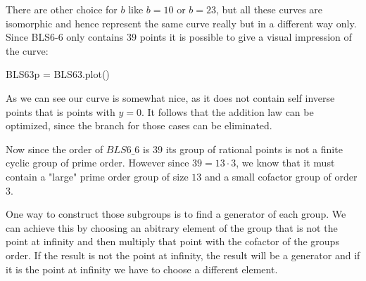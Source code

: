 There are other choice for $b$ like $b=10$ or $b=23$, but all these curves are isomorphic and hence represent the same curve really but in a different way only. Since BLS6-6 only contains $39$ points it is possible to give a visual impression of the curve:
\begin{sagesilent}
BLS63p = BLS63.plot()
\end{sagesilent}
\begin{center} 
\end{center}
As we can see our curve is somewhat nice, as it does not contain self inverse points that is points with $y=0$. It follows that the addition law can be optimized, since the branch for those cases can be eliminated. 

Now since the order of $BLS6\_6$ is $39$ its group of rational points is not a finite cyclic group of prime order. However since $39=13\cdot 3$, we know that it must contain a "large" prime order group of size $13$ and a small cofactor group of order $3$. 

One way to construct those subgroups is to find a generator of each group. We can achieve this by choosing an abitrary element of the group that is not the point at infinity and then multiply that point with the cofactor of the groups order. If the result is not the point at infinity, the result will be a generator and if it is the point at infinity we have to choose a different element. 

